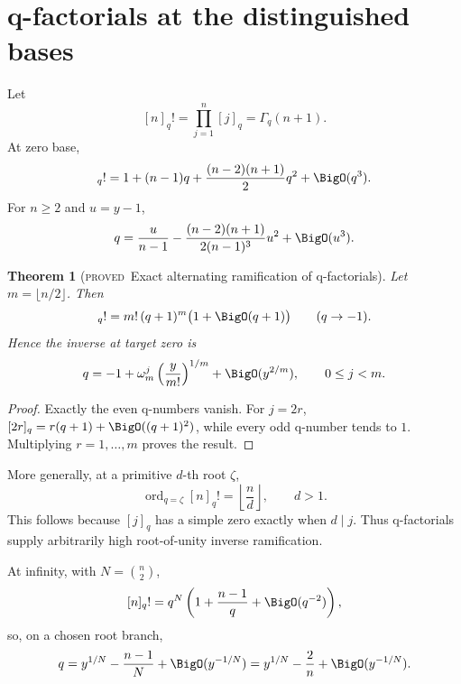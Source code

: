 \documentclass[11pt,letterpaper,oneside,openany]{book}
\newtheorem{theorem}{Theorem}[chapter]
\theoremstyle{definition}
\theoremstyle{remark}
\newcommand{\ord}{\operatorname{ord}}
\newcommand{\statusproved}{\textcolor{provedgreen}{\textsc{proved}}}
\begin{document}
\section{q-factorials at the distinguished bases}
Let
\[
 [n]_q!=\prod_{j=1}^n[j]_q=\Gamma_q(n+1).
\]
At zero base,
\begin{equation}
 [n]_q!=1+(n-1)q+\frac{(n-2)(n+1)}2q^2+\BigO(q^3).
 \label{eq:qfactorial-zero}
\end{equation}
For \(n\ge2\) and \(u=y-1\),
\begin{equation}
 q=\frac{u}{n-1}
 -\frac{(n-2)(n+1)}{2(n-1)^3}u^2+\BigO(u^3).
 \label{eq:qfactorial-zero-inverse}
\end{equation}

\begin{theorem}[\statusproved\ Exact alternating ramification of q-factorials]
Let \(m=\lfloor n/2\rfloor\).  Then
\begin{equation}
 [n]_q!=m!\,(q+1)^m\bigl(1+\BigO(q+1)\bigr)
 \qquad(q\to-1).
 \label{eq:qfactorial-minus-one}
\end{equation}
Hence the inverse at target zero is
\begin{equation}
 q=-1+\omega_m^j\left(\frac{y}{m!}\right)^{1/m}
 +\BigO(y^{2/m}),
 \qquad 0\le j<m.
 \label{eq:qfactorial-minus-one-inverse}
\end{equation}
\end{theorem}
\begin{proof}
Exactly the even q-numbers vanish.  For \(j=2r\),
\([2r]_q=r(q+1)+\BigO((q+1)^2)\), while every odd q-number tends to \(1\).
Multiplying \(r=1,\ldots,m\) proves the result.
\end{proof}

More generally, at a primitive \(d\)-th root \(\zeta\),
\begin{equation}
 \ord_{q=\zeta}[n]_q!=\left\lfloor\frac nd\right\rfloor,
 \qquad d>1.
 \label{eq:qfactorial-root-order}
\end{equation}
This follows because \([j]_q\) has a simple zero exactly when \(d\mid j\).
Thus q-factorials supply arbitrarily high root-of-unity inverse ramification.

At infinity, with \(N=\binom n2\),
\[
 [n]_q!=q^N\left(1+\frac{n-1}{q}+\BigO(q^{-2})\right),
\]
so, on a chosen root branch,
\begin{equation}
 q=y^{1/N}-\frac{n-1}{N}+\BigO(y^{-1/N})
 =y^{1/N}-\frac2n+\BigO(y^{-1/N}).
 \label{eq:qfactorial-infinity-inverse}
\end{equation}
\end{document}
